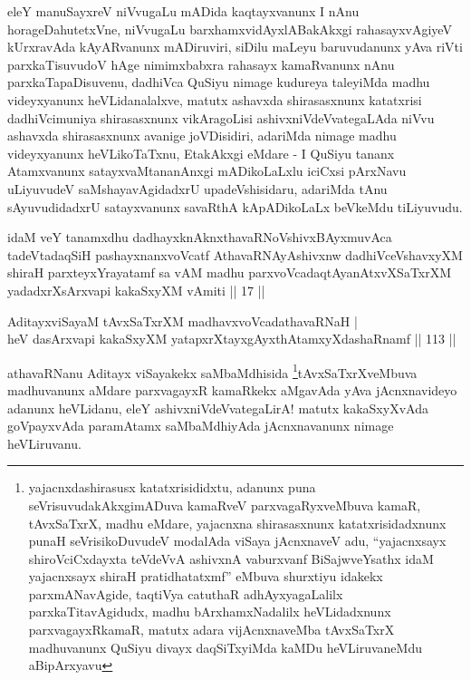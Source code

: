 \begin{artha}
eleY manuSayxreV niVvugaLu mADida kaqtayxvanunx I nAnu
horageDahutetxVne, niVvugaLu barxhamxvidAyxlABakAkxgi rahasayxvAgiyeV
kUrxravAda kAyARvanunx mADiruviri, siDilu maLeyu
baruvudanunx yAva riVti parxkaTisuvudoV hAge nimimxbabxra rahasayx
kamaRvanunx nAnu parxkaTapaDisuvenu, dadhiVca QuSiyu nimage kudureya
taleyiMda madhu videyxyanunx heVLidanalalxve, matutx ashavxda
shirasasxnunx katatxrisi dadhiVcimuniya shirasasxnunx vikAragoLisi
ashivxniVdeVvategaLAda niVvu ashavxda shirasasxnunx avanige
joVDisidiri, adariMda nimage madhu videyxyanunx heVLikoTaTxnu,
EtakAkxgi eMdare - I QuSiyu tananx Atamxvanunx satayxvaMtananAnxgi
mADikoLaLxlu iciCxsi pArxNavu uLiyuvudeV saMshayavAgidadxrU
upadeVshisidaru, adariMda tAnu sAyuvudidadxrU satayxvanunx savaRthA
kApADikoLaLx beVkeMdu tiLiyuvudu.
\end{artha}


\begin{kandikeshl}
idaM veY tanamxdhu dadhayxknAknxthavaRNoV\s shivxBAyxmuvAca tadeVtadaqSiH pashayxnanxvoVcatf AthavaRNAyAshivxnw dadhiVceV\s shavxyXM shiraH parxteyxYrayatamf sa vAM madhu parxvoVcadaqtAyanAtxvXSaTxrXM yadadxrXsArxvapi kakaSxyXM vAmiti || 17 ||
\end{kandikeshl}


\begin{shl}
AditayxviSayaM tAvxSaTxrXM madhavxvoVcadathavaRNaH |\\
heV dasArxvapi kakaSxyXM yatapxrXtayxgAyxthAtamxyXdashaRnamf \hfill || 113 ||
\end{shl}

\begin{artha}
athavaRNanu Aditayx viSayakekx
saMbaMdhisida \footnote{yajacnxdashirasusx katatxrisididxtu,
  adanunx puna seVrisuvudakAkxgimADuva kamaRveV parxvagaRyxveMbuva
  kamaR, tAvxSaTxrX, madhu eMdare, yajacnxna shirasasxnunx
  katatxrisidadxnunx punaH seVrisikoDuvudeV modalAda viSaya
  jAcnxnaveV adu, ``yajacnxsayx shiroV\s ciCxdayxta teVdeVvA ashivxnA vaburxvanf BiSajwveYsathx idaM yajacnxsayx shiraH pratidhatatxmf'' eMbuva shurxtiyu idakekx parxmANavAgide,
  taqtiVya catuthaR adhAyxyagaLalilx parxkaTitavAgidudx, madhu
  bArxhamxNadalilx heVLidadxnunx parxvagayxRkamaR, matutx adara
  vijAcnxnaveMba tAvxSaTxrX madhuvanunx QuSiyu divayx daqSiTxyiMda
  kaMDu heVLiruvaneMdu aBipArxyavu}tAvxSaTxrXveMbuva madhuvanunx  aMdare
parxvagayxR kamaRkekx aMgavAda yAva jAcnxnavideyo adanunx heVLidanu,
eleY ashivxniVdeVvategaLirA! matutx kakaSxyXvAda goVpayxvAda
paramAtamx saMbaMdhiyAda jAcnxnavanunx nimage heVLiruvanu.
\end{artha}

